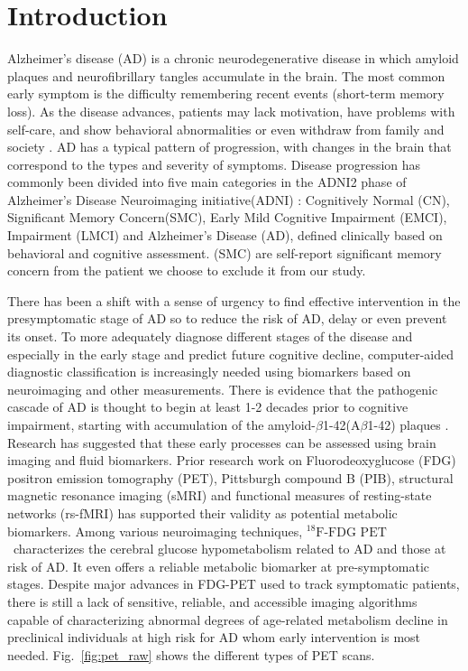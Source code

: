 \documentclass[authoryear,preprint,revi	ew,12pt]{elsarticle}
\newcommand{\Alz} {{Alzheimer\textquoteright s} }
\newcommand{\FDGPET}   {$ ^{18}\textrm{F-FDG PET} $~}
\begin{document}
\section{Introduction}
\Alz disease (AD) is a chronic neurodegenerative disease in which amyloid plaques and neurofibrillary tangles accumulate in the brain. The most common early symptom is the difficulty remembering recent events (short-term memory loss). As the disease advances, patients may lack motivation, have problems with self-care, and show behavioral abnormalities or even withdraw from family and society \citep{Burns2009}. AD has a typical pattern of progression, with changes in the brain that correspond to the types and severity of symptoms. Disease progression has commonly been divided into five main categories in the ADNI2 phase of \Alz Disease Neuroimaging initiative(ADNI) \citep{weiner2013alzheimer}: Cognitively Normal (CN), Significant Memory Concern(SMC), Early Mild Cognitive Impairment (EMCI), Impairment (LMCI) and \Alz Disease (AD), defined clinically based on behavioral and cognitive assessment. (SMC) are self-report significant memory concern from the patient we choose to exclude it from our study.

There has been a shift with a sense of urgency to find effective intervention in the presymptomatic stage of AD so to reduce the risk of AD, delay or even prevent its onset. To more adequately diagnose different stages of the disease and especially in the early stage and predict future cognitive decline, computer-aided diagnostic classification is increasingly needed using biomarkers based on neuroimaging and other measurements.
There is evidence that the pathogenic cascade of AD is thought to begin at least 1-2 decades prior to cognitive impairment, starting with accumulation of the amyloid-$\beta$1-42(A$\beta$1-42) plaques \citep{langbaum2013ushering}. Research has suggested that these early processes can be assessed using brain imaging and fluid biomarkers. Prior research work on Fluorodeoxyglucose (FDG) positron emission tomography (PET), Pittsburgh compound B (PIB), structural magnetic resonance imaging (sMRI) and functional measures of resting-state networks (rs-fMRI) has supported their validity as potential metabolic biomarkers. Among various neuroimaging techniques, \FDGPET characterizes the cerebral glucose hypometabolism related to AD and those at risk of AD. It even offers a reliable metabolic biomarker at pre-symptomatic stages. Despite major advances in FDG-PET used to track symptomatic patients, there is still a lack of sensitive, reliable, and accessible imaging algorithms capable of characterizing abnormal degrees of age-related metabolism decline in preclinical individuals at high risk for AD whom early intervention is most needed. Fig.~\ref{fig:pet_raw} shows the different types of PET scans.
\end{document}
